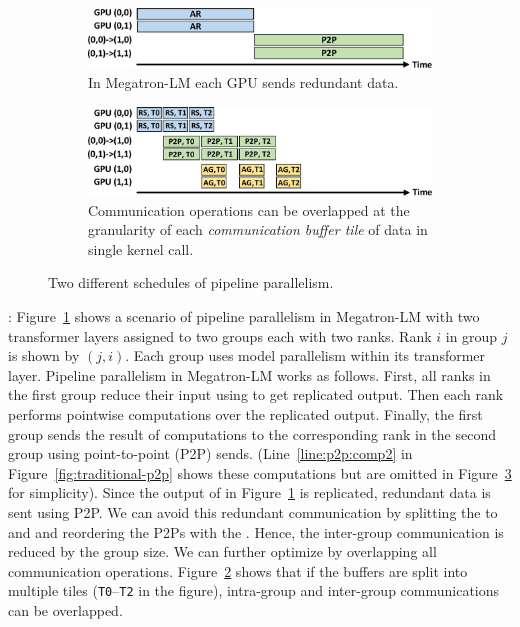 \begin{figure}[t]
  \begin{subfigure}{\columnwidth}
  \centering
  \includegraphics[width=.85\linewidth]{figures/pipeline-p2p-fusion-1.pdf}  
  \caption{In Megatron-LM each GPU sends redundant data. \label{fig:p2p-fusion-1}}
\end{subfigure}
\par\bigskip %
\begin{subfigure}{\columnwidth}
  \centering
  \includegraphics[width=.85\linewidth]{figures/pipeline-p2p-fusion-3.pdf} 
  \caption{Communication operations can be overlapped at the granularity of each 
  \emph{communication buffer tile} of data in single kernel 
  call.\label{fig:p2p-fusion-3}}
\end{subfigure}
  \caption{Two different schedules of pipeline parallelism.
\label{fig:P2Ptimeline}}
\end{figure}

: 
Figure~\ref{fig:p2p-fusion-1} shows a scenario of pipeline parallelism in Megatron-LM
with two transformer layers assigned to two groups each with two ranks. 
Rank $i$ in group $j$ is shown by $(j,i)$.
Each group uses model parallelism within its transformer layer.
Pipeline parallelism in Megatron-LM works as follows.
First, all ranks in the first group reduce their input using 
\allreduce to get replicated output.
Then each rank performs pointwise computations over the replicated output.
Finally, the first group sends the result of computations to the corresponding rank in the
second group using point-to-point (P2P) sends. (Line~\ref{line:p2p:comp2} in Figure~\ref{fig:traditional-p2p} shows these computations but are omitted in Figure~\ref{fig:P2Ptimeline} for simplicity). Since the output of \allreduce in 
Figure~\ref{fig:p2p-fusion-1} is replicated, redundant data is sent using P2P.
We can avoid this redundant communication by splitting
the \allreduce to \reducescatter and \allgather and reordering the P2Ps with the
\allgather. 
Hence, the inter-group communication is reduced by 
the group size.
We can further optimize by overlapping all communication operations. 
Figure~\ref{fig:p2p-fusion-3} shows that if the 
buffers are split into multiple tiles (\texttt{T0}--\texttt{T2} in the figure), 
intra-group and inter-group communications can be overlapped.

